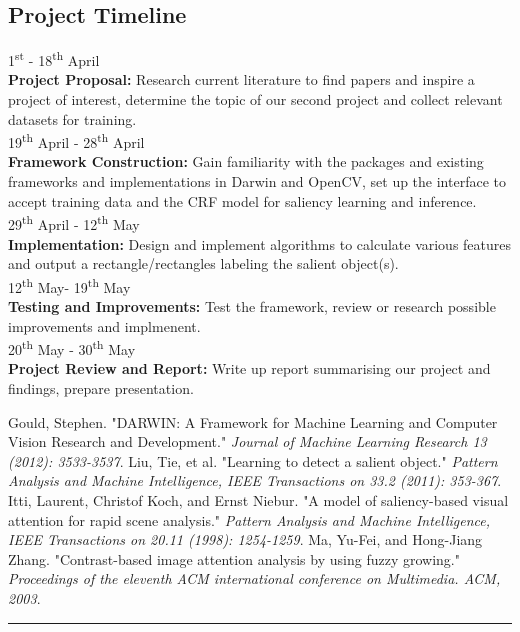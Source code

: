 \documentclass[12pt,a4paper]{article}
\newcommand{\BOLD}{\textbf}
\newcommand{\Hrule}{\textcolor{blue}{\rule{\linewidth}{0.5mm}}}
\newcommand{\SUPER}{\textsuperscript}
\newcommand{\TIMELINE}[3]{#1\\\BOLD{#2} #3}
\newcommand{\TIMELINESPACE}{\\[0.3cm]}
\begin{document}
\begin{multicols}{2}
\section{Project Timeline}
\TIMELINE{1\SUPER{st}  - 18\SUPER{th} April}{Project Proposal:}{Research current literature to find papers and inspire a project of interest, determine the topic of our second project and collect relevant datasets for training.}\TIMELINESPACE
%
\TIMELINE{19\SUPER{th} April - 28\SUPER{th} April}{Framework Construction:}{Gain familiarity with the packages and existing frameworks and implementations in Darwin and OpenCV, set up the interface to accept training data and the CRF model for saliency learning and inference.} \TIMELINESPACE
%
\TIMELINE{29\SUPER{th} April - 12\SUPER{th} May}{Implementation:}{Design and implement algorithms to calculate various features and output a rectangle/rectangles labeling the salient object(s).}\TIMELINESPACE
%
\TIMELINE{12\SUPER{th} May- 19\SUPER{th} May}{Testing and Improvements:}{Test the framework, review or research possible improvements and implmenent.}\TIMELINESPACE
%
\TIMELINE{20\SUPER{th} May - 30\SUPER{th} May}{Project Review and Report:}{Write up report summarising our project and findings, prepare presentation.}
\begin{thebibliography}{8}
    \footnotesize
     Gould, Stephen. "DARWIN: A Framework for Machine Learning and Computer Vision Research and Development." \textit{Journal of Machine Learning Research 13 (2012): 3533-3537}. 
     Liu, Tie, et al. "Learning to detect a salient object." \textit{Pattern Analysis and Machine Intelligence, IEEE Transactions on 33.2 (2011): 353-367}. 
     Itti, Laurent, Christof Koch, and Ernst Niebur. "A model of saliency-based visual attention for rapid scene analysis."\textit{ Pattern Analysis and Machine Intelligence, IEEE Transactions on 20.11 (1998): 1254-1259}.
     Ma, Yu-Fei, and Hong-Jiang Zhang. "Contrast-based image attention analysis by using fuzzy growing."\textit{ Proceedings of the eleventh ACM international conference on Multimedia. ACM, 2003}. 
\end{thebibliography}

\end{multicols}
\vfill\Hrule
\end{document}
